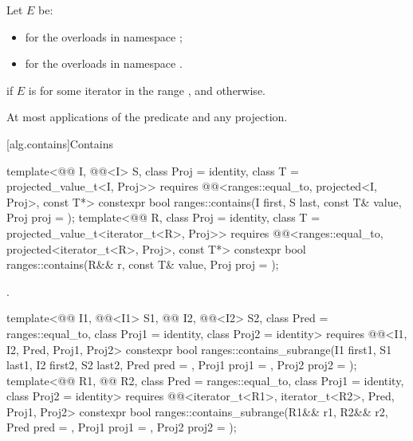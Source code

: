 \begin{itemdescr}
\pnum
Let $E$ be:
\begin{itemize}
\item
   for the overloads in namespace ;
\item
  for the overloads in namespace .
\end{itemize}

\pnum
\returns
{} if $E$ is 
for some iterator  in the range , and
 otherwise.

\pnum
\complexity
At most  applications of the predicate and any projection.
\end{itemdescr}

[alg.contains]{Contains}

%
\begin{itemdecl}
template<@@ I, @@<I> S, class Proj = identity,
         class T = projected_value_t<I, Proj>>
  requires @@<ranges::equal_to, projected<I, Proj>, const T*>
  constexpr bool ranges::contains(I first, S last, const T& value, Proj proj = {});
template<@@ R, class Proj = identity, class T = projected_value_t<iterator_t<R>, Proj>>
  requires @@<ranges::equal_to, projected<iterator_t<R>, Proj>, const T*>
  constexpr bool ranges::contains(R&& r, const T& value, Proj proj = {});
\end{itemdecl}

\begin{itemdescr}
\pnum
\returns
{}.
\end{itemdescr}

%
\begin{itemdecl}
template<@@ I1, @@<I1> S1,
         @@ I2, @@<I2> S2,
         class Pred = ranges::equal_to, class Proj1 = identity, class Proj2 = identity>
  requires @@<I1, I2, Pred, Proj1, Proj2>
  constexpr bool ranges::contains_subrange(I1 first1, S1 last1, I2 first2, S2 last2,
                                           Pred pred = {}, Proj1 proj1 = {}, Proj2 proj2 = {});
template<@@ R1, @@ R2,
         class Pred = ranges::equal_to, class Proj1 = identity, class Proj2 = identity>
  requires @@<iterator_t<R1>, iterator_t<R2>, Pred, Proj1, Proj2>
  constexpr bool ranges::contains_subrange(R1&& r1, R2&& r2, Pred pred = {},
                                           Proj1 proj1 = {}, Proj2 proj2 = {});
\end{itemdecl}

